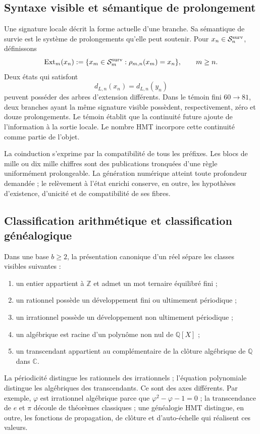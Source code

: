 \subsection{Syntaxe visible et sémantique de prolongement}

Une signature locale décrit la forme actuelle d'une branche. Sa sémantique de
survie est le système de prolongements qu'elle peut soutenir. Pour
\(x_n\in\mathcal S_n^{\rm surv}\), définissons
\[
 \operatorname{Ext}_m(x_n)
 :=\{x_m\in\mathcal S_m^{\rm surv}:\rho_{m,n}(x_m)=x_n\},
 \qquad m\geq n.
\]
Deux états qui satisfont
\[
 d_{L,n}(x_n)=d_{L,n}(y_n)
\]
peuvent posséder des arbres d'extension différents. Dans le témoin fini
\(60\to81\), deux branches ayant la même signature visible possèdent, respectivement,
zéro et douze prolongements. Le témoin établit que la continuité future
ajoute de l'information à la sortie locale. Le nombre HMT incorpore cette continuité
comme partie de l'objet.

La coinduction s'exprime par la compatibilité de tous les préfixes.
Les blocs de mille ou dix mille chiffres sont des publications tronquées d'une règle
uniformément prolongeable. La génération numérique atteint toute
profondeur demandée ; le relèvement à l'état enrichi conserve,
en outre, les hypothèses d'existence, d'unicité et de compatibilité de ses fibres.

\subsection{Classification arithmétique et classification généalogique}

Dans une base \(b\geq2\), la présentation canonique d'un réel sépare les classes
visibles suivantes :
\begin{enumerate}
\item un entier appartient à \(\mathbb Z\) et admet un mot ternaire
      équilibré fini ;
\item un rationnel possède un développement fini ou ultimement périodique ;
\item un irrationnel possède un développement non ultimement périodique ;
\item un algébrique est racine d'un polynôme non nul de \(\mathbb Q[X]\) ;
\item un transcendant appartient au complémentaire de la clôture algébrique de
      \(\mathbb Q\) dans \(\mathbb C\).
\end{enumerate}
La périodicité distingue les rationnels des irrationnels ; l'équation polynomiale
distingue les algébriques des transcendants. Ce sont des axes différents. Par exemple,
\(\varphi\) est irrationnel algébrique parce que
\(\varphi^2-\varphi-1=0\) ; la transcendance de \(e\) et \(\pi\) découle de
théorèmes classiques ; une généalogie HMT distingue, en outre, les
fonctions de propagation, de clôture et d'auto-échelle qui réalisent ces valeurs.

